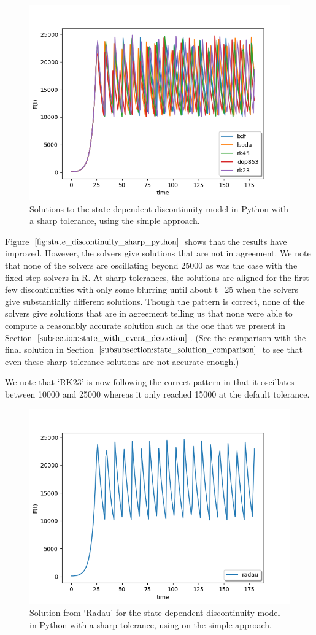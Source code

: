 \begin{figure}[H]
\centering
\includegraphics[width=0.7\linewidth]{./figures/state_discontinuity_sharp_py}
\caption{Solutions to the state-dependent discontinuity model in Python with a sharp tolerance, using the simple approach.}
\label{fig:state_discontinuity_sharp_python}
\end{figure}

Figure $\ref{fig:state_discontinuity_sharp_python}$ shows that the results have improved. However, the solvers give solutions that are not in agreement. We note that none of the solvers are oscillating beyond 25000 as was the case with the fixed-step solvers in R. At sharp tolerances, the solutions are aligned for the first few discontinuities with only some blurring until about t=25 when the solvers give substantially different solutions. Though the pattern is correct, none of the solvers give solutions that are in agreement telling us that none were able to compute a reasonably accurate solution such as the one that we present in Section $\ref{subsection:state_with_event_detection}$. (See the comparison with the final solution in Section $\ref{subsubsection:state_solution_comparison}$ to see that even these sharp tolerance solutions are not accurate enough.)

We note that `RK23' is now following the correct pattern in that it oscillates between 10000 and 25000 whereas it only reached 15000 at the default tolerance. 

\begin{figure}[H]
\centering
\includegraphics[width=0.7\linewidth]{./figures/state_discontinuity_sharp_radau_py}
\caption{Solution from `Radau' for the state-dependent discontinuity model in Python with a sharp tolerance, using on the simple approach.}
\label{fig:state_discontinuity_sharp_radau_py}
\end{figure}

